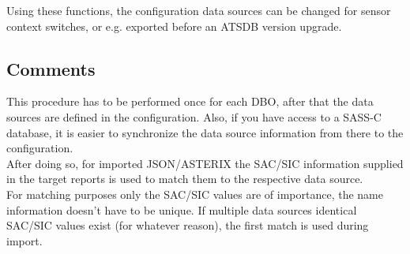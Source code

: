 Using these functions, the configuration data sources can be changed for sensor context switches, or e.g. exported before an ATSDB version upgrade.

\subsection{Comments}

This procedure  has to be performed once for each DBO, after that the data sources are defined in the configuration. Also, if you have access to a SASS-C database, it is easier to synchronize the data source information from there to the configuration. \\

After doing so, for imported JSON/ASTERIX the SAC/SIC information supplied in the target reports is used to match them to the respective data source. \\

For matching purposes only the SAC/SIC values are of importance, the name information doesn't have to be unique. If multiple data sources identical SAC/SIC values exist (for whatever reason), the first match is used during import. 
